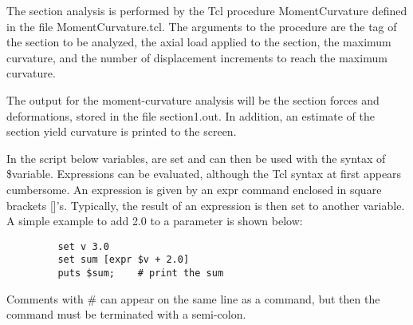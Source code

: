 \documentclass[12pt]{article}
\begin{document}
The section analysis is performed by the Tcl procedure MomentCurvature
defined in the file MomentCurvature.tcl. The arguments to the
procedure are the tag of the section to be analyzed, the axial
load applied to the section, the maximum curvature, and the number
of displacement increments to reach the maximum curvature.

\vspace{0.2in} 

The output for the moment-curvature analysis will be the section
forces and deformations, stored in the file section1.out.
In addition, an estimate of the section yield curvature is
printed to the screen. 

\vspace{0.2in} 

In the script below variables, are set and can then be used with the
syntax of \$variable. Expressions can be evaluated, although the Tcl
syntax at first appears cumbersome.  An expression is given by an expr
command enclosed in square brackets []'s. Typically, the result of an
expression is then set to another variable.  A simple example to add
2.0 to a parameter is shown below:

{\sf\small
\begin{verbatim}
         set v 3.0 
         set sum [expr $v + 2.0] 
         puts $sum;    # print the sum 
\end{verbatim}}

Comments with \# can appear on the same line
as a command, but then the command must be terminated with a
semi-colon.
\end{document}
